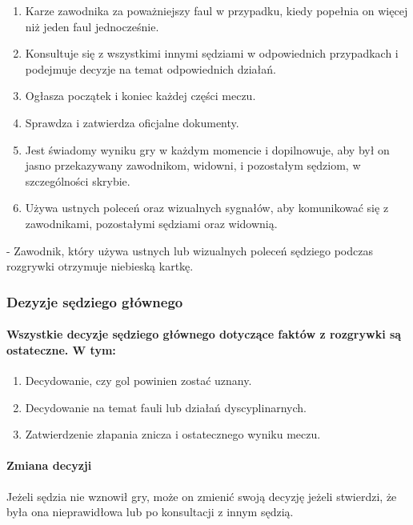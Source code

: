 \documentclass[12pt]{article}
\newcommand\bluecard{\bgroup\color{blue}\markoverwith{\textcolor{blue}{\rule[-0.5ex]{2pt}{0.4pt}}}\ULon}
\begin{document}
\begin{enumerate}
	\item Karze zawodnika za poważniejszy faul w przypadku, kiedy popełnia on
	      więcej niż jeden faul jednocześnie.

	\item Konsultuje się z wszystkimi innymi sędziami w odpowiednich
	      przypadkach i podejmuje decyzje na temat odpowiednich działań.

	\item Ogłasza początek i koniec każdej części meczu.

	\item Sprawdza i zatwierdza oficjalne dokumenty.

	\item Jest świadomy wyniku gry w każdym momencie i dopilnowuje, aby był on
	      jasno przekazywany zawodnikom, widowni, i pozostałym sędziom, w
	      szczególności skrybie.

	\item Używa ustnych poleceń oraz wizualnych sygnałów, aby komunikować się z
	      zawodnikami, pozostałymi sędziami oraz widownią.
\end{enumerate}

\bluecard{Niebieska kartka} - Zawodnik, który używa ustnych lub wizualnych
poleceń sędziego podczas rozgrywki otrzymuje niebieską kartkę.

\subsubsection{Dezyzje sędziego głównego}

\paragraph{Wszystkie decyzje sędziego głównego dotyczące faktów z
	rozgrywki są ostateczne. W tym:}
\begin{enumerate}
	\item Decydowanie, czy gol powinien zostać uznany.

	\item Decydowanie na temat fauli lub działań dyscyplinarnych.

	\item Zatwierdzenie złapania znicza i ostatecznego wyniku meczu.
\end{enumerate}

\paragraph{Zmiana decyzji}
Jeżeli sędzia nie wznowił gry, może
on zmienić swoją decyzję jeżeli stwierdzi, że była ona nieprawidłowa lub
po konsultacji z innym sędzią.
\end{document}
